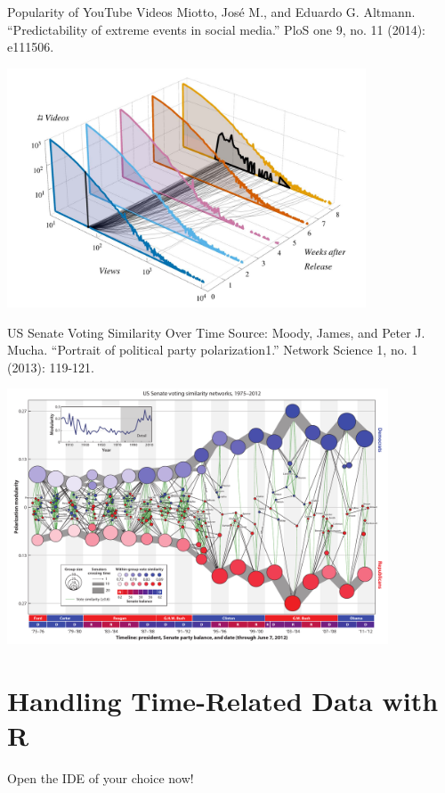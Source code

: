 \documentclass[notes, aspectratio=1610]{beamer}
\begin{document}
\begin{frame}{Popularity of YouTube Videos}
	{Miotto, José M., and Eduardo G. Altmann. ``Predictability of extreme 
	events in social media.'' PloS one 9, no. 11 (2014): e111506.}
	\centering

	\includegraphics[width=0.8\textwidth]{images/youtube_popularity.png}
\end{frame}

\begin{frame}{US Senate Voting Similarity Over Time}
	{Source: Moody, James, and Peter J. Mucha. ``Portrait of political 
	party polarization1.'' Network Science 1, no. 1 (2013): 119-121.}
	\centering

	\includegraphics[width=0.85\textwidth]{images/moody_mucha.png}
\end{frame}


\section{Handling Time-Related Data with R}

\begin{frame}{}{}
	\centering 
  \Large
  Open the IDE of your choice now!
\end{frame}


\end{document}
